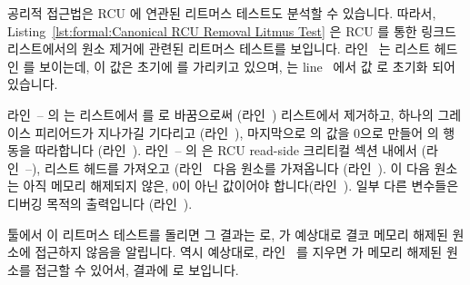 \begin{lineref}
공리적 접근법은 RCU 에 연관된 리트머스 테스트도 분석할 수 있습니다.
따라서,
Listing~\ref{lst:formal:Canonical RCU Removal Litmus Test}
은 RCU 를 통한 링크드 리스트에서의 원소 제거에 관련된 리트머스 테스트를
보입니다.
라인~ 는 리스트 헤드인  를 보이는데, 이 값은 초기에  를
가리키고 있으며, 는 line~ 에서 값  로 초기화 되어
있습니다.
\iffalse

Axiomatic approaches can also analyze litmus tests involving RCU.
To that end,
Listing~\ref{lst:formal:Canonical RCU Removal Litmus Test}
shows a litmus test corresponding to the canonical RCU-mediated
removal from a linked list.
Line~\lnref{head} shows \co{x} as the list head, initially
referencing \co{y}, which in turn is initialized to the value
\co{2} on line~\lnref{tail:1}.
\fi

	라인~-- 의  는 리스트에서  를 
로 바꿈으로써 (라인~) 리스트에서 제거하고, 하나의 그레이스
피리어드가 지나가길 기다리고 (라인~), 마지막으로  의 값을
0으로 만들어  의 행동을 따라합니다 (라인~).
라인~-- 의  은 RCU read-side 크리티컬 섹션
내에서 (라인~--), 리스트 헤드를 가져오고
(라인~ 다음 원소를 가져옵니다 (라인~).
이 다음 원소는 아직 메모리 해제되지 않은, 0이 아닌 값이어야
합니다(라인~).
일부 다른 변수들은 디버깅 목적의 출력입니다 (라인~).
\iffalse

\co{P0()} on lines~\lnref{P0start}--\lnref{P0end}
removes element \co{y} from the list by replacing it with element \co{z}
(line~\lnref{assignnewtail}),
waits for a grace period (line~\lnref{sync}),
and finally zeroes \co{y} to emulate \co{free()} (line~\lnref{free}).
\co{P1()} on lines~\lnref{P1start}--\lnref{P1end}
executes within an RCU read-side critical section
(lines~\lnref{rl}--\lnref{rul}),
picking up the list head (line~\lnref{rderef}) and then
loading the next element (line~\lnref{read}).
The next element should be non-zero, that is, not yet freed
(line~\lnref{exists_}).
Several other variables are output for debugging purposes
(line~\lnref{locations_}).
\fi

 툴에서 이 리트머스 테스트를 돌리면 그 결과는  로,  가 예상대로 결코 메모리 해제된 원소에 접근하지 않음을 알립니다.
역시 예상대로, 라인~ 를 지우면  가 메모리 해제된 원소를 접근할 수 있어서,  결과에  로 보입니다.
\iffalse

The output of the \co{herd} tool when running this litmus test features
\co{Never}, indicating that \co{P0()} never accesses a freed element,
as expected.
Also as expected, removing line~\lnref{sync} results in \co{P0()}
accessing a freed element, as indicated by the \co{Sometimes} in
the \co{herd} output.
\fi
\end{lineref}

